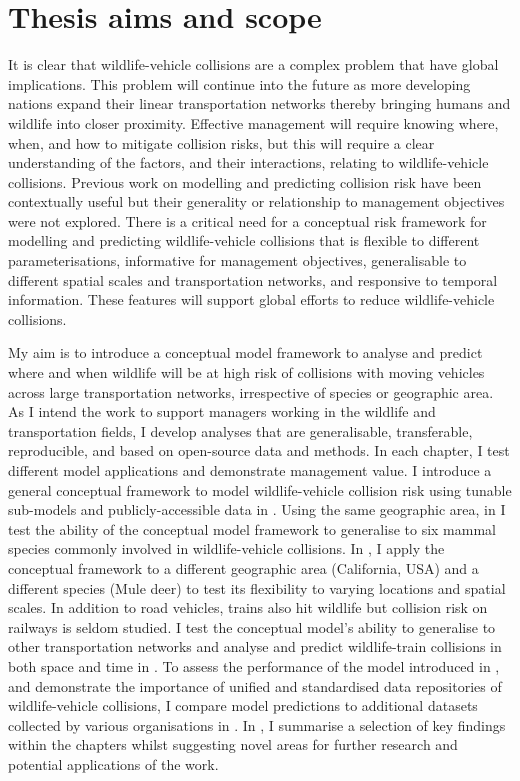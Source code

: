 \section{Thesis aims and scope}

It is clear that wildlife-vehicle collisions are a complex problem that have global implications. This problem will continue into the future as more developing nations expand their linear transportation networks thereby bringing humans and wildlife into closer proximity. Effective management will require knowing where, when, and how to mitigate collision risks, but this will require a clear understanding of the factors, and their interactions, relating to wildlife-vehicle collisions. Previous work on modelling and predicting collision risk have been contextually useful but their generality or relationship to management objectives were not explored. There is a critical need for a conceptual risk framework for modelling and predicting wildlife-vehicle collisions that is flexible to different parameterisations, informative for management objectives, generalisable to different spatial scales and transportation networks, and responsive to temporal information. These features will support global efforts to reduce wildlife-vehicle collisions.

My aim is to introduce a conceptual model framework to analyse and predict where and when wildlife will be at high risk of collisions with moving vehicles across large transportation networks, irrespective of species or geographic area. As I intend the work to support managers working in the wildlife and transportation fields, I develop analyses that are generalisable, transferable, reproducible, and based on open-source data and methods. In each chapter, I test different model applications and demonstrate management value. I introduce a general conceptual framework to model wildlife-vehicle collision risk using tunable sub-models and publicly-accessible data in . Using the same geographic area, in  I test the ability of the conceptual model framework to generalise to six mammal species commonly involved in wildlife-vehicle collisions. In , I apply the conceptual framework to a different geographic area (California, USA) and a different species (Mule deer) to test its flexibility to varying locations and spatial scales. In addition to road vehicles, trains also hit wildlife but collision risk on railways is seldom studied. I test the conceptual model's ability to generalise to other transportation networks and analyse and predict wildlife-train collisions in both space and time in . To assess the performance of the model introduced in , and demonstrate the importance of unified and standardised data repositories of wildlife-vehicle collisions, I compare model predictions to additional datasets collected by various organisations in . In , I summarise a selection of key findings within the chapters whilst suggesting novel areas for further research and potential applications of the work.